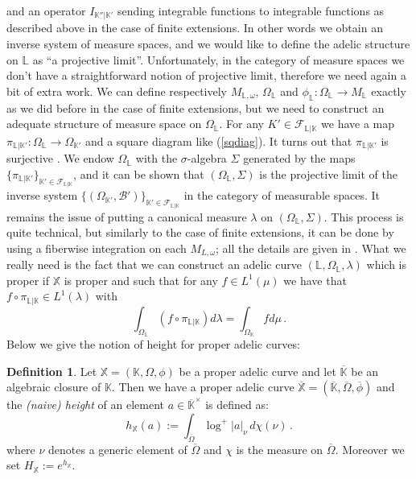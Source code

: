 \documentclass[10 pt,a4paper]{article}
\theoremstyle{plain}
\theoremstyle{definition}
\newtheorem{defn}[thm]{Definition}
\theoremstyle{named}
\begin{document}
and an operator $I_{\mathbb K''|\mathbb K'}$ sending integrable functions to integrable functions as described above in the case of finite extensions. In other words we obtain an inverse system of measure spaces, and we would like to define the adelic structure on $\mathbb L$ as ``a projective limit''. Unfortunately, in the category of measure spaces we don't have a straightforward notion of projective limit, therefore we need again a bit of extra work.  We can define respectively $M_{\mathbb L,\omega}$, $\Omega_{\mathbb L}$ and $\phi_{\mathbb L}\colon \Omega_{\mathbb L}\to M_{\mathbb L}$ exactly as we did before in the case of finite extensions, but we need to construct an adequate structure of measure space on $\Omega_{\mathbb L}$. For any $K'\in\mathcal F_{\mathbb L|\mathbb K}$ we have  a map $\pi_{\mathbb L|\mathbb K'}:\Omega_{\mathbb L}\to \Omega_{\mathbb K'}$ and a square diagram like (\ref{sqdiag}).  It turns out that $\pi_{\mathbb L|\mathbb K'}$ is surjective \cite[Proposition 3.4.5]{Ch-Mo}. We endow $\Omega_{\mathbb L}$ with the $\sigma$-algebra $\Sigma$ generated by the maps $\{\pi_{\mathbb L|\mathbb K'}\}_{\mathbb K'\in \mathcal F_{\mathbb L|\mathbb K}}$, and it can be shown that $(\Omega_{\mathbb L},\Sigma)$ is the projective limit of the inverse system $\{(\Omega_{\mathbb K'},\mathcal B')\}_{\mathbb K'\in \mathcal F_{\mathbb L|\mathbb K}}$ in the category of measurable spaces. It remains the issue of putting a canonical measure $\lambda$ on $(\Omega_{\mathbb L},\Sigma)$. This process is quite technical, but similarly to the case of finite extensions, it can be done by using a fiberwise integration on each $M_{L,\omega}$; all the details are given in \cite[3.4.2]{Ch-Mo}. What we really need is the fact that we can construct an adelic curve $(\mathbb L,\Omega_{\mathbb L},\lambda)$ which is proper if $\mathbb X$ is proper and such that for any $f\in L^1(\mu)$ we have that $f\circ \pi_{\mathbb L|\mathbb K}\in L^1(\lambda)$ with
\begin{equation}\label{int_ext}
\int_{\Omega_{\mathbb L}}(f\circ \pi_{\mathbb L|\mathbb K})d\lambda=\int_{\Omega_{\mathbb K}} fd\mu\,.
\end{equation}
Below we give the notion of height for proper adelic curves:
\begin{defn}\label{height}
Let $\mathbb X=(\mathbb K, \Omega,\phi)$ be a proper adelic curve and let $\overline {\mathbb K}$ be an algebraic closure of $\mathbb K$. Then we have  a proper adelic curve $\overline{\mathbb X}=(\overline {\mathbb K},\overline{\Omega},\overline\phi)$ and the \emph{(naive) height} of an element $a\in\overline {\mathbb K}^\times$ is defined as:
$$
h_{\mathbb X}(a):=\int_{\overline{\Omega}} \log^+|a|_{\nu}\, d\chi(\nu)\,.
$$
where $\nu$ denotes a generic element of $\overline \Omega$ and $\chi$ is the measure on $\overline \Omega$. Moreover we set $H_{\mathbb X}:=e^{h_{\mathbb X}}$. 
\end{defn}
\end{document}
